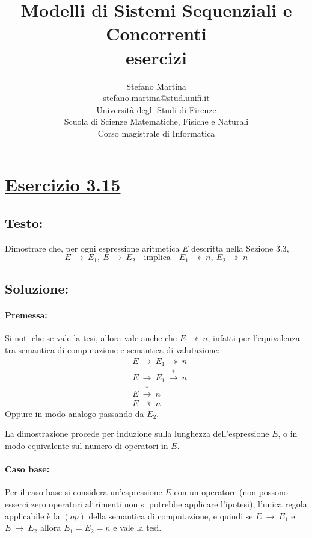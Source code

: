 \documentclass[a4paper,twosides]{report}
\author{
  {\Large Stefano Martina}\\
  {\small stefano.martina@stud.unifi.it}\\
  Universit\`a degli Studi di Firenze\\
  Scuola di Scienze Matematiche, Fisiche e Naturali\\
  Corso magistrale di Informatica
}
\title{{\Huge\bfseries Modelli di Sistemi Sequenziali e
    Concorrenti}\\{\large\bfseries esercizi}}
\begin{document}
\maketitle
\tableofcontents
\label{toc}
\newpage

\section*{\hyperref[toc]{Esercizio 3.15}}
\subsection*{Testo:}
Dimostrare che, per ogni espressione aritmetica $E$ descritta nella
Sezione 3.3,
$$
E\ \rightarrow\ E_1,\ E\ \rightarrow\ E_2\quad \text{implica}\quad E_1\
\twoheadrightarrow\ n,\ E_2\ \twoheadrightarrow\ n
$$

\subsection*{Soluzione:}
\paragraph{Premessa:}Si noti che se vale la tesi, allora vale anche che $E\
\twoheadrightarrow\ n$, infatti per l'equivalenza tra semantica di
computazione e semantica di valutazione:
\begin{align*}
  &E\ \rightarrow\ E_1\ \twoheadrightarrow\ n\\
  &E\ \rightarrow\ E_1\ \xrightarrow{*}\ n\\
  &E\ \xrightarrow{*}\ n\\
  &E\ \twoheadrightarrow\ n
\end{align*}
Oppure in modo analogo passando da $E_2$.

La dimostrazione procede per induzione sulla lunghezza dell'espressione $E$, o in modo
equivalente sul numero di operatori in $E$.

\paragraph{Caso base:}Per il caso base si considera un'espressione $E$ con un operatore (non possono esserci zero
operatori altrimenti non si potrebbe applicare l'ipotesi), l'unica regola
applicabile è la $(op)$ della semantica di computazione, e quindi se
$E\ \rightarrow\ E_1$ e $E\ \rightarrow\ E_2$ allora
$E_1=E_2=n$ e vale la tesi.
\end{document}
